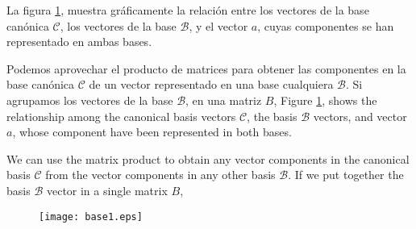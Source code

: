 \begin{paracol}{2}
La figura \ref{fig:base1}, muestra gráficamente la relación entre los vectores de la base canónica $\mathcal{C}$, los vectores de la base $\mathcal{B}$, y el vector $a$, cuyas componentes se han representado en ambas bases.

Podemos aprovechar el producto de matrices para obtener las componentes en la base canónica $\mathcal{C}$ de un vector representado en una base cualquiera $\mathcal{B}$. Si agrupamos los vectores de la base $\mathcal{B}$, en una matriz $B$,
\switchcolumn
Figure \ref{fig:base1}, shows the relationship among the canonical basis vectors $\mathcal{C}$, the basis $\mathcal{B}$ vectors, and vector $a$, whose component have been represented in both bases.

We can use the matrix product to obtain any vector components in the canonical basis $\mathcal{C}$ from the vector components in any other basis $\mathcal{B}$. If we put together the basis $\mathcal{B}$ vector in a single matrix $B$,
\end{paracol}
\begin{figure}[h]
\centering
\texttt{[image: base1.eps]}
\label{fig:base1}
\end{figure}

